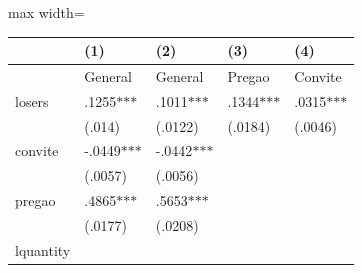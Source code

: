\documentclass[10pt]{article}
\begin{document}
{{\begin{table}[H]
\begin{adjustbox}{max width=\textwidth}
\begin{tabular}{p{3.92cm}p{2.57cm}p{2.5cm}p{2.5cm}p{2.5cm}}
\hline
\multicolumn{1}{|p{5.3cm}}{} & 
\multicolumn{1}{|p{3.14cm}}{\centering
 (1)} & 
\multicolumn{1}{|p{3.02cm}}{\centering
 (2)} & 
\multicolumn{1}{|p{3.02cm}}{\centering
 (3)} & 
\multicolumn{1}{|p{3.02cm}|}{\centering
 (4)} \\ 
\hline
\multicolumn{1}{|p{5.3cm}}{} & 
\multicolumn{1}{|p{3.14cm}}{\centering
    General} & 
\multicolumn{1}{|p{3.02cm}}{\centering
    General} & 
\multicolumn{1}{|p{3.02cm}}{\centering
 Pregao} & 
\multicolumn{1}{|p{3.02cm}|}{\centering
    Convite} \\ 
\hline
\multicolumn{1}{|p{5.3cm}}{ losers} & 
\multicolumn{1}{|p{3.14cm}}{\centering
.1255$\ast$$\ast$$\ast$} & 
\multicolumn{1}{|p{3.02cm}}{\centering
.1011$\ast$$\ast$$\ast$} & 
\multicolumn{1}{|p{3.02cm}}{\centering
.1344$\ast$$\ast$$\ast$} & 
\multicolumn{1}{|p{3.02cm}|}{\centering
.0315$\ast$$\ast$$\ast$} \\ 
\hline
\multicolumn{1}{|p{5.3cm}}{} & 
\multicolumn{1}{|p{3.14cm}}{\centering
(.014)} & 
\multicolumn{1}{|p{3.02cm}}{\centering
(.0122)} & 
\multicolumn{1}{|p{3.02cm}}{\centering
(.0184)} & 
\multicolumn{1}{|p{3.02cm}|}{\centering
(.0046)} \\ 
\hline
\multicolumn{1}{|p{5.3cm}}{ convite} & 
\multicolumn{1}{|p{3.14cm}}{\centering
-.0449$\ast$$\ast$$\ast$} & 
\multicolumn{1}{|p{3.02cm}}{\centering
-.0442$\ast$$\ast$$\ast$} & 
\multicolumn{1}{|p{3.02cm}}{} & 
\multicolumn{1}{|p{3.02cm}|}{} \\ 
\hline
\multicolumn{1}{|p{5.3cm}}{} & 
\multicolumn{1}{|p{3.14cm}}{\centering
(.0057)} & 
\multicolumn{1}{|p{3.02cm}}{\centering
(.0056)} & 
\multicolumn{1}{|p{3.02cm}}{} & 
\multicolumn{1}{|p{3.02cm}|}{} \\ 
\hline
\multicolumn{1}{|p{5.3cm}}{ pregao} & 
\multicolumn{1}{|p{3.14cm}}{\centering
.4865$\ast$$\ast$$\ast$} & 
\multicolumn{1}{|p{3.02cm}}{\centering
.5653$\ast$$\ast$$\ast$} & 
\multicolumn{1}{|p{3.02cm}}{} & 
\multicolumn{1}{|p{3.02cm}|}{} \\ 
\hline
\multicolumn{1}{|p{5.3cm}}{} & 
\multicolumn{1}{|p{3.14cm}}{\centering
(.0177)} & 
\multicolumn{1}{|p{3.02cm}}{\centering
(.0208)} & 
\multicolumn{1}{|p{3.02cm}}{} & 
\multicolumn{1}{|p{3.02cm}|}{} \\ 
\hline
\multicolumn{1}{|p{5.3cm}}{ lquantity} & 
\multicolumn{1}{|p{3.14cm}}{\centering
}
\end{tabular}
\end{adjustbox}
\end{table}}}
\end{document}
